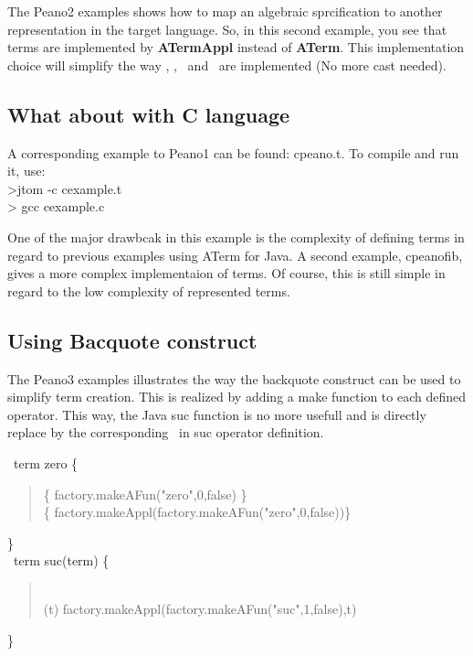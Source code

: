 The Peano2 examples shows how to map an algebraic sprcification to
another representation in the target language. So, in this second
example, you see that terms are \textsf{implemented} by \textbf{ATermAppl} instead
of \textbf{ATerm}. This implementation choice will simplify the way
\implement, \getfs, \cmpfs\ and \getsub\ are implemented (No more cast
needed).

\subsection{What about with C language}
A corresponding example to Peano1 can be found: cpeano.t.
To compile and run it, use:
\\ >jtom -c cexample.t
\\ > gcc cexample.c

One of the major drawbcak in this example is the complexity of
defining terms in regard to previous examples using ATerm for Java. A
second example, cpeanofib, gives a more complex implementaion of
terms.
Of course, this is still simple in regard to the low complexity of
represented terms.

\subsection{Using Bacquote construct}
The Peano3 examples illustrates the way the backquote construct can be
used to simplify term creation. This is realized by adding a
\textsf{make} function to each defined operator. This way, the Java suc
function is no more usefull and is directly replace by the
corresponding \make\ in suc operator definition. 

\op\ term zero \{\\
\begin{quote}
  \fsym \{ factory.makeAFun("zero",0,false) \}\\
  \make \{ factory.makeAppl(factory.makeAFun("zero",0,false))\}\\
\end{quote}
\}\\
  
\op\ term suc(term) \{\\
\begin{quote}
 \\
 \make(t) { factory.makeAppl(factory.makeAFun("suc",1,false),t) }\\
\end{quote}
\}\\

